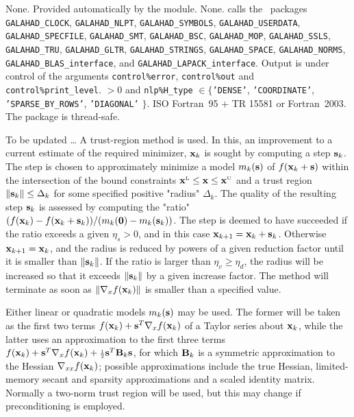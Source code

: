 \documentclass{galahad}
\newcommand{\packagename}{EPF}
\newcommand{\sL}{\s{L}}
\newcommand{\sU}{\s{U}}
\begin{document}

\galgeneral

\galcommon None.
\galworkspace Provided automatically by the module.
\galroutines None.
\galmodules {\tt \packagename\_solve} calls the \galahad\ packages
{\tt GALAHAD\_CLOCK},
{\tt GALAHAD\_NLPT},
{\tt GALAHAD\_SY\-M\-BOLS}, \sloppy
{\tt GALAHAD\_USERDATA},
{\tt GALAHAD\_SPECFILE},
{\tt GALAHAD\_SMT},
{\tt GALAHAD\_BSC},
{\tt GALAHAD\_MOP},
{\tt GALAHAD\_SSLS},
{\tt GALAHAD\_TRU},
{\tt GALAHAD\_GLTR},
{\tt GALAHAD\_STRINGS},
{\tt GALAHAD\_SPACE},
{\tt GALAHAD\_\-NORMS},
{\tt GALAHAD\_BLAS\_interface},
and
{\tt GALAHAD\_LAPACK\_interface}.
\galio Output is under control of the arguments
 {\tt control\%error}, {\tt control\%out} and {\tt control\%print\_level}.
 $> 0$ and
{\tt nlp\%H\_type} $\in \{${\tt 'DENSE'},
 {\tt 'COORDINATE'}, {\tt 'SPARSE\_BY\_ROWS'}, {\tt 'DIAGONAL'} $\}$.
\galportability ISO Fortran~95 + TR 15581 or Fortran~2003.
The package is thread-safe.


\galmethod
To be updated \ldots
A trust-region method is used. In this, an improvement to a current
estimate of the required minimizer, ${\mathbf{x}}_k$ is sought by computing a
step ${\mathbf{s}}_k$. The step is chosen to approximately minimize a model $m_k({\mathbf{s}})$
of $f({\mathbf{x}}_k + {\mathbf{s}})$ within the intersection of the bound constraints
$\bmx\sL \leq \bmx \leq \bmx\sU$ and a trust region $\|{\mathbf{s}}_k\| \leq \Delta_k$
for some specified positive "radius" $\Delta_k$. The quality of the
resulting step ${\mathbf{s}}_k$ is assessed by computing the "ratio"
$(f({\mathbf{x}}_k) - f({\mathbf{x}}_k + {\mathbf{s}}_k))/ (m_k({\mathbf{0}}) - m_k({\mathbf{s}}_k))$.
The step is deemed to have succeeded if the ratio exceeds a given $\eta_s > 0$,
and in this case ${\mathbf{x}}_{k+1} = {\mathbf{x}}_k + {\mathbf{s}}_k$. Otherwise
${\mathbf{x}}_{k+1} = {\mathbf{x}}_k$, and the radius is reduced by powers of a given
reduction factor until it is smaller than $\|{\mathbf{s}}_k\|$. If the ratio
is larger than  $\eta_v \geq \eta_d$, the radius will be increased so that
it exceeds $\|{\mathbf{s}}_k\|$ by a given increase factor. The method will terminate
as soon as $\|\nabla_x f({\mathbf{x}}_k)\|$ is smaller than a specified value.

Either linear or quadratic models $m_k({\mathbf{s}})$ may be used. The former will be
taken as the first two terms $f({\mathbf{x}}_k) + {\mathbf{s}}^T \nabla_x f({\mathbf{x}}_k)$
of a Taylor series about ${\mathbf{x}}_k$, while the latter uses an
approximation to the first three terms
$f({\mathbf{x}}_k) + {\mathbf{s}}^T \nabla_x f({\mathbf{x}}_k) + {\scriptstyle \frac{1}{2}}
{\mathbf{s}}^T {\mathbf{B}}_k {\mathbf{s}}$,
for which ${\mathbf{B}}_k$ is a symmetric approximation to the Hessian
$\nabla_{xx} f({\mathbf{x}}_k)$; possible approximations include the true Hessian,
limited-memory secant and sparsity approximations and a scaled identity matrix.
Normally a two-norm trust region will be used, but this may change
if preconditioning is employed.
\end{document}
